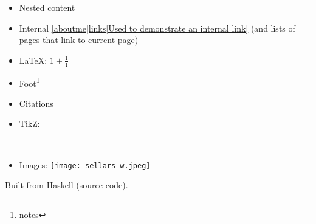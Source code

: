 \begin{itemize}
\item Nested content
\item Internal \ref{aboutme|links|Used to demonstrate an internal link} (and lists of pages that link to current page)
\item \LaTeX: $1+\frac{1}{1}$
\item Foot\footnote{notes}
\item Citations \cite{mazieres2005get}
\item TikZ: \
\item Images: \texttt{[image: sellars-w.jpeg]}

\end{itemize}

Built from Haskell (\href{https://github.com/kris-brown/KBKB}{source code}).
